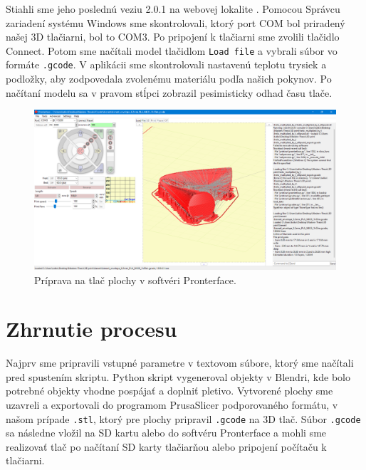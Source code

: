 Stiahli sme jeho poslednú veziu 2.0.1 na webovej lokalite \cite{Pronterface}. Pomocou Správcu zariadení systému Windows sme skontrolovali, ktorý port COM bol priradený našej 3D tlačiarni, bol to COM3. Po pripojení k tlačiarni sme zvolili tlačidlo Connect. Potom sme načítali model tlačidlom \verb|Load file| a vybrali súbor vo formáte \verb|.gcode|. V aplikácii sme skontrolovali nastavenú teplotu trysiek a podložky, aby zodpovedala zvolenému materiálu podľa našich pokynov. Po načítaní modelu sa v pravom stĺpci zobrazil pesimisticky odhad času tlače.

\begin{figure}[h]
	\centering
	\includegraphics[width=\textwidth]{images/pronterface.png}
	\caption[Softvér Pronterface.]{Príprava na tlač plochy v softvéri Pronterface.}
	\label{fig:pronterface}
\end{figure}

\section{Zhrnutie procesu}
Najprv sme pripravili vstupné parametre v textovom súbore, ktorý sme načítali pred spustením skriptu. Python skript vygeneroval objekty v Blendri, kde bolo potrebné objekty vhodne pospájať a doplniť pletivo. Vytvorené plochy sme uzavreli a exportovali do programom PrusaSlicer podporovaného formátu, v našom prípade \verb|.stl|, ktorý pre plochy pripravil \verb|.gcode| na 3D tlač. Súbor \verb|.gcode| sa následne vložil na SD kartu alebo do softvéru Pronterface a mohli sme realizovať tlač po načítaní SD karty tlačiarňou alebo pripojení počítaču k tlačiarni.

